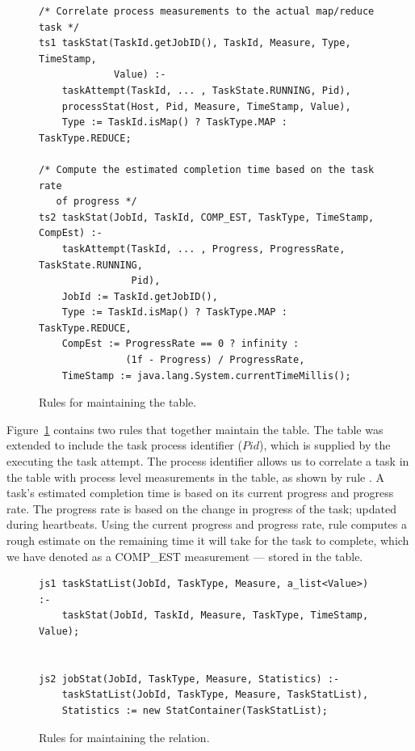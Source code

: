 \begin{figure}
\ssp
\centering
\begin{lstlisting}
/* Correlate process measurements to the actual map/reduce task */
ts1 taskStat(TaskId.getJobID(), TaskId, Measure, Type, TimeStamp, 
             Value) :-
    taskAttempt(TaskId, ... , TaskState.RUNNING, Pid),
    processStat(Host, Pid, Measure, TimeStamp, Value),
    Type := TaskId.isMap() ? TaskType.MAP : TaskType.REDUCE;
        
/* Compute the estimated completion time based on the task rate 
   of progress */
ts2 taskStat(JobId, TaskId, COMP_EST, TaskType, TimeStamp, CompEst) :-
    taskAttempt(TaskId, ... , Progress, ProgressRate, TaskState.RUNNING, 
                Pid),
    JobId := TaskId.getJobID(),
    Type := TaskId.isMap() ? TaskType.MAP : TaskType.REDUCE,
    CompEst := ProgressRate == 0 ? infinity : 
               (1f - Progress) / ProgressRate,
    TimeStamp := java.lang.System.currentTimeMillis();
\end{lstlisting}
\caption{\label{ch:hop:fig:taskstat} Rules for maintaining the  table.}
\end{figure}

Figure~\ref{ch:hop:fig:taskstat} contains two rules that together maintain the
 table.  The  table was extended to include the
task process identifier ($Pid$), which is supplied by the \TT executing the
task attempt.  The process identifier allows us to correlate a task in the
 table with process level measurements in the 
table, as shown by rule .  A task's estimated completion time is based
on its current progress and progress rate.  The progress rate is based on the
change in progress of the task; updated during \TT heartbeats.  Using the
current progress and progress rate, rule  computes a rough estimate on
the remaining time it will take for the task to complete, which we have denoted
as a COMP\_EST measurement --- stored in the  table.

\begin{figure}
\ssp
\centering
\begin{lstlisting}
js1 taskStatList(JobId, TaskType, Measure, a_list<Value>) :-
    taskStat(JobId, TaskId, Measure, TaskType, TimeStamp, Value);

        
js2 jobStat(JobId, TaskType, Measure, Statistics) :-
    taskStatList(JobId, TaskType, Measure, TaskStatList),
    Statistics := new StatContainer(TaskStatList);
\end{lstlisting}
\caption{\label{ch:hop:fig:jobstat} Rules for maintaining the  relation.}
\end{figure}

